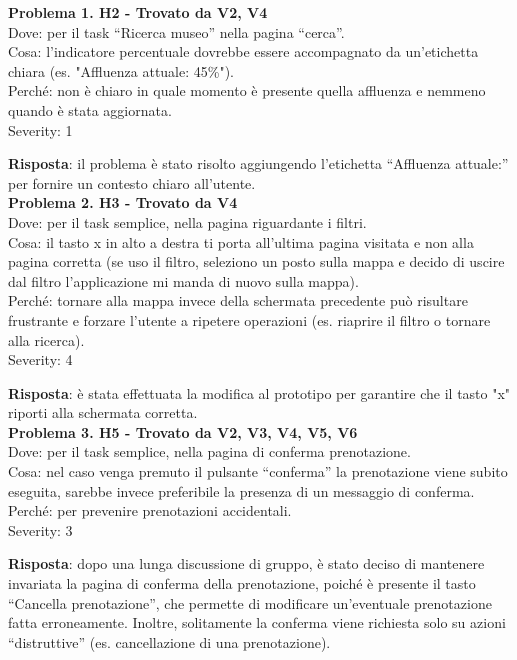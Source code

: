 \documentclass{article}
\begin{document}
\noindent \textbf{Problema 1. H2 - Trovato da V2, V4} \\
Dove: per il task “Ricerca museo” nella pagina “cerca”. \\
Cosa: l’indicatore percentuale dovrebbe essere accompagnato da un'etichetta chiara (es. "Affluenza attuale: 45\%"). \\
Perché: non è chiaro in quale momento è presente quella affluenza e nemmeno quando è stata aggiornata. \\
Severity: 1

\noindent \textbf{Risposta}: il problema è stato risolto aggiungendo l’etichetta “Affluenza attuale:” per fornire un contesto chiaro all’utente.\\

\noindent \textbf{Problema 2. H3 - Trovato da V4} \\
Dove: per il task semplice, nella pagina riguardante i filtri. \\
Cosa: il tasto x in alto a destra ti porta all’ultima pagina visitata e non alla pagina corretta (se uso il filtro, seleziono un posto sulla mappa e decido di uscire dal filtro l’applicazione mi manda di nuovo sulla mappa). \\
Perché: tornare alla mappa invece della schermata precedente può risultare frustrante e forzare l’utente a ripetere operazioni (es. riaprire il filtro o tornare alla ricerca). \\
Severity: 4

\noindent \textbf{Risposta}: è stata effettuata la modifica al prototipo per garantire che il tasto "x" riporti alla schermata corretta.\\

\noindent \textbf{Problema 3. H5 - Trovato da V2, V3, V4, V5, V6} \\
Dove: per il task semplice, nella pagina di conferma prenotazione. \\
Cosa: nel caso venga premuto il pulsante “conferma” la prenotazione viene subito eseguita, sarebbe invece preferibile la presenza di un messaggio di conferma. \\
Perché: per prevenire prenotazioni accidentali. \\
Severity: 3

\noindent \textbf{Risposta}: dopo una lunga discussione di gruppo, è stato deciso di mantenere invariata la pagina di conferma della prenotazione, poiché è presente il tasto “Cancella prenotazione”, che permette di modificare un’eventuale prenotazione fatta erroneamente. Inoltre, solitamente la conferma viene richiesta solo su azioni “distruttive” (es. cancellazione di una prenotazione).\\
\end{document}
